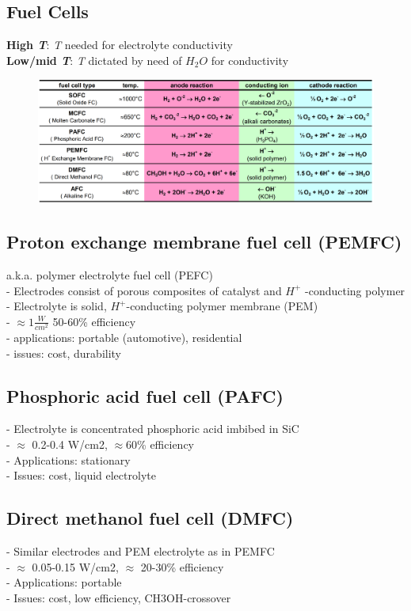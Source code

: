\documentclass[a4paper,10pt,landscape]{scrartcl}
\begin{document}
\begin{multicols*}{3}
\section{Fuel Cells}
\textbf{High \textit{T}}: \textit{T} needed for electrolyte conductivity \\
\textbf{Low/mid \textit{T}}: \textit{T} dictated by need of $H_2O$ for conductivity
\vspace{-.5cm}
\begin{figure}[H]
    \centering
    \includegraphics[width=1\linewidth]{src/fuel_cell.png}
\end{figure}
\vspace{-.5cm}
\subsection{Proton exchange membrane fuel cell (PEMFC)}
a.k.a. polymer electrolyte fuel cell (PEFC) \\
- Electrodes consist of porous composites of catalyst and $H^+$ -conducting polymer \\
- Electrolyte is solid, $H^+$-conducting polymer membrane (PEM) \\
- $\approx 1 \frac{W}{cm^2}$ 50-60\% efficiency \\
- applications: portable (automotive), residential \\
- issues: cost, durability
\subsection{Phosphoric acid fuel cell (PAFC)}
- Electrolyte is concentrated phosphoric acid imbibed in SiC \\
- $\approx$ 0.2-0.4 W/cm2, $\approx$60\% efficiency \\
- Applications: stationary \\
- Issues: cost, liquid electrolyte
\subsection{Direct methanol fuel cell (DMFC)}
- Similar electrodes and PEM electrolyte as in PEMFC \\
- $\approx$ 0.05-0.15 W/cm2, $\approx$ 20-30\% efficiency \\
- Applications: portable \\
-  Issues: cost, low efficiency, CH3OH-crossover

\end{multicols*}
\end{document}
